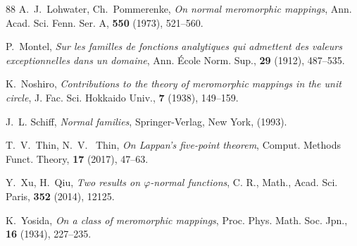 \documentclass[11pt, reqno]{amsart}
\numberwithin{equation}{section}
\theoremstyle{definition}
\theoremstyle{remark}
\theoremstyle{plain}
\begin{document}
\begin{thebibliography}{88}
A.~J.~Lohwater, Ch.~Pommerenke,
\textit{On normal meromorphic mappings},
Ann. Acad. Sci. Fenn. Ser. A, \textbf{550} (1973), 521--560.\smallskip

P.~Montel,
\textit{Sur les familles de fonctions analytiques qui admettent des valeurs exceptionnelles dans un domaine},
Ann. \'Ecole Norm. Sup., \textbf{29} (1912), 487--535.\smallskip

K.~Noshiro,
\textit{Contributions to the theory of meromorphic mappings in the unit circle},
J. Fac. Sci. Hokkaido Univ., \textbf{7} (1938), 149--159.\smallskip

J.~L. Schiff,
\textit{Normal families},
Springer-Verlag, New York, (1993).\smallskip

T.~V.~Thin, N.~V.~ Thin, {\it On Lappan's five-point theorem},
Comput. Methods Funct. Theory, {\bf 17} (2017), 47--63.\smallskip

Y.~Xu, H.~Qiu,
\textit{Two results on $\varphi$-normal functions},
C. R., Math., Acad. Sci. Paris, \textbf{352} (2014), 12125.\smallskip

K.~Yosida,
\textit{On a class of meromorphic mappings},
Proc. Phys. Math. Soc. Jpn., \textbf{16} (1934), 227--235.\smallskip

\end{thebibliography}
\end{document}
